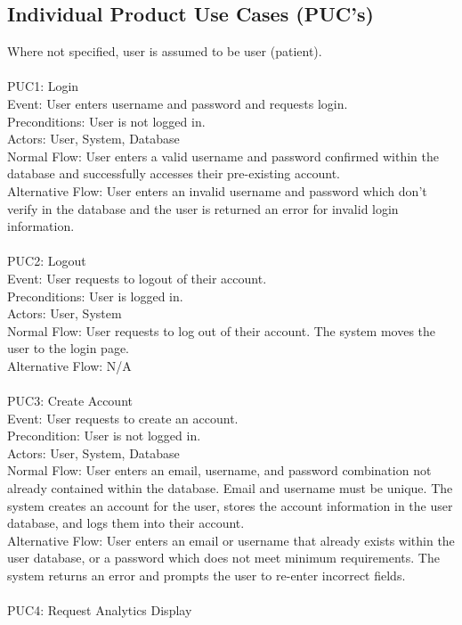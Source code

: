 \documentclass[12pt]{article}
\begin{document}
\subsection{Individual Product Use Cases (PUC's)}
Where not specified, user is assumed to be user (patient).\\ \\
PUC1: Login\\
Event: User enters username and password and requests login.\\
Preconditions: User is not logged in.\\
Actors: User, System, Database\\
Normal Flow: User enters a valid username and password confirmed within the database and successfully accesses their pre-existing account.\\
Alternative Flow: User enters an invalid username and password which don’t verify in the database and the user is returned an error for invalid login information.\\ \\
PUC2: Logout\\
Event: User requests to logout of their account.\\
Preconditions: User is logged in.\\
Actors: User, System\\
Normal Flow: User requests to log out of their account. The system moves the user to the login page.\\
Alternative Flow: N/A\\ \\
PUC3: Create Account\\
Event: User requests to create an account.\\
Precondition: User is not logged in.\\
Actors: User, System, Database\\
Normal Flow: User enters an email, username, and password combination not already contained within the database. Email and username must be unique. The system creates an account for the user, stores the account information in the user database, and logs them into their account.\\
Alternative Flow: User enters an email or username that already exists within the user database, or a password which does not meet minimum requirements. The system returns an error and prompts the user to re-enter incorrect fields.\\ \\
PUC4: Request Analytics Display\\
\end{document}
